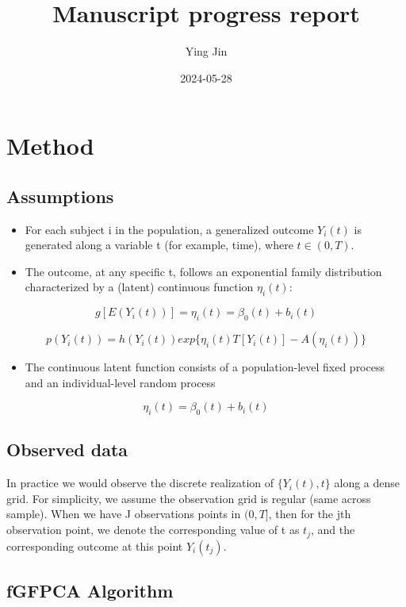 \documentclass[
]{article}
\title{Manuscript progress report}
\author{Ying Jin}
\date{2024-05-28}
\providecommand{\tightlist}{%
  \setlength{\itemsep}{0pt}\setlength{\parskip}{0pt}}
\begin{document}
\maketitle

{
\setcounter{tocdepth}{3}
\tableofcontents
}
\section{Method}\label{method}

\subsection{Assumptions}\label{assumptions}

\begin{itemize}
\tightlist
\item
  For each subject i in the population, a generalized outcome \(Y_i(t)\)
  is generated along a variable t (for example, time), where
  \(t \in (0, T)\).
\item
  The outcome, at any specific t, follows an exponential family
  distribution characterized by a (latent) continuous function
  \(\eta_i(t)\):
\end{itemize}

\[g[E(Y_i(t))] = \eta_i(t) = \beta_0(t)+b_i(t)\]

\[p(Y_i(t)) = h(Y_i(t))exp\{\eta_i(t)T[Y_i(t)]-A(\eta_i(t))\}\]

\begin{itemize}
\tightlist
\item
  The continuous latent function consists of a population-level fixed
  process and an individual-level random process
\end{itemize}

\[\eta_i(t) = \beta_0(t)+b_i(t)\]

\subsection{Observed data}\label{observed-data}

In practice we would observe the discrete realization of
\(\{Y_i(t), t\}\) along a dense grid. For simplicity, we assume the
observation grid is regular (same across sample). When we have J
observations points in \((0, T]\), then for the jth observation point,
we denote the corresponding value of t as \(t_j\), and the corresponding
outcome at this point \(Y_i(t_j)\).

\subsection{fGFPCA Algorithm}\label{fgfpca-algorithm}
\end{document}
